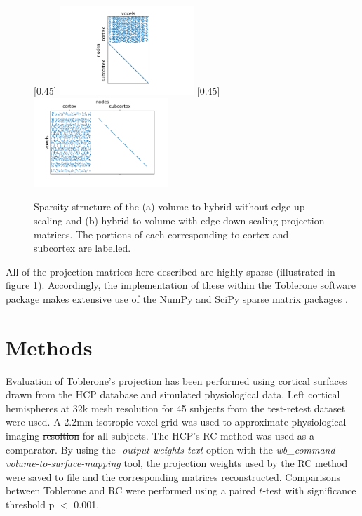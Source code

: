 \documentclass[12pt]{report}
\providecommand{\DIFaddtex}[1]{{\protect\color{blue}\uwave{#1}}} %
\providecommand{\DIFdeltex}[1]{{\protect\color{red}\sout{#1}}}                      %
\providecommand{\DIFaddbegin}{} %
\providecommand{\DIFaddend}{} %
\providecommand{\DIFdelbegin}{} %
\providecommand{\DIFdelend}{} %
\providecommand{\DIFadd}[1]{\texorpdfstring{\DIFaddtex{#1}}{#1}} %
\providecommand{\DIFdel}[1]{\texorpdfstring{\DIFdeltex{#1}}{}} %
\newcommand{\DIFscaledelfig}{0.5}
\newlength{\DIFdelgraphicswidth} %
\newlength{\DIFdelgraphicsheight} %
\newcommand{\DIFaddincludegraphics}[2][]{{\color{blue}\fbox{\DIFOincludegraphics[#1]{#2}}}} %
\newcommand{\DIFdelincludegraphics}[2][]{%
\sbox{\DIFdelgraphicsbox}{\DIFOincludegraphics[#1]{#2}}%
\settoboxwidth{\DIFdelgraphicswidth}{\DIFdelgraphicsbox} %
\settoboxtotalheight{\DIFdelgraphicsheight}{\DIFdelgraphicsbox} %
\scalebox{\DIFscaledelfig}{%
\parbox[b]{\DIFdelgraphicswidth}{\usebox{\DIFdelgraphicsbox}\\[-\baselineskip] \rule{\DIFdelgraphicswidth}{0em}}\llap{\resizebox{\DIFdelgraphicswidth}{\DIFdelgraphicsheight}{%
\setlength{\unitlength}{\DIFdelgraphicswidth}%
\begin{picture}(1,1)%
\thicklines\linethickness{2pt} %
{\color[rgb]{1,0,0}\put(0,0){\framebox(1,1){}}}%
{\color[rgb]{1,0,0}\put(0,0){\line( 1,1){1}}}%
{\color[rgb]{1,0,0}\put(0,1){\line(1,-1){1}}}%
\end{picture}%
}\hspace*{3pt}}} %
} %
\DeclareRobustCommand{\DIFaddbegin}{\DIFOaddbegin \let\includegraphics\DIFaddincludegraphics} %
\DeclareRobustCommand{\DIFaddend}{\DIFOaddend \let\includegraphics\DIFOincludegraphics} %
\DeclareRobustCommand{\DIFdelbegin}{\DIFOdelbegin \let\includegraphics\DIFdelincludegraphics} %
\DeclareRobustCommand{\DIFdelend}{\DIFOaddend \let\includegraphics\DIFOincludegraphics} %
\begin{document}
\begin{figure}[H]
\centering
\subcaptionbox{\label{v2n_mat}}[0.45\textwidth]
{\includegraphics[width=0.45\textwidth]{v2n}}
\subcaptionbox{\label{n2v_mat}}[0.45\textwidth]
{\includegraphics[width=0.45\textwidth]{n2v}}
\caption{Sparsity structure of the (a) volume to hybrid without edge up-scaling and (b) hybrid to volume with edge down-scaling projection matrices. The portions of each corresponding to cortex and subcortex are labelled.} 
\label{sparsity}
\end{figure}

All of the projection matrices here described are highly sparse (illustrated in figure \ref{sparsity}). Accordingly, the implementation of these within the Toblerone software package makes extensive use of the NumPy and SciPy sparse matrix packages \cite{Walt2011, Virtanen2020}.


\section{Methods}
Evaluation of Toblerone's projection has been performed using cortical surfaces drawn from the HCP database \cite{HCP_data, Glasser2013} and simulated physiological data. Left cortical hemispheres at 32k mesh resolution for 45 subjects from the test-retest dataset were used. A 2.2mm isotropic voxel grid was used to approximate physiological imaging \DIFdelbegin \DIFdel{resoltion }\DIFdelend \DIFaddbegin \DIFadd{resolution }\DIFaddend for all subjects. The HCP's RC method was used as a comparator. By using the \textit{-output-weights-text} option with the \textit{wb\_command -volume-to-surface-mapping} tool, the projection weights used by the RC method were saved to file and the corresponding matrices reconstructed. Comparisons between Toblerone and RC were performed using a paired $t$-test with significance threshold p $<$ 0.001. 
\end{document}
